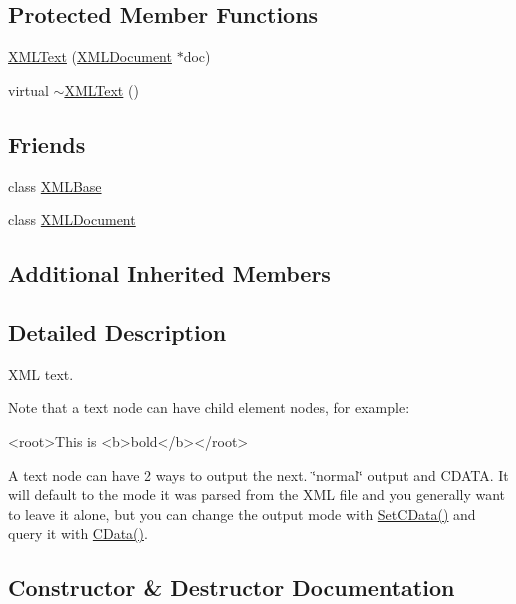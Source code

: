 \subsection*{Protected Member Functions}
\begin{DoxyCompactItemize}
\item 
\hyperlink{classtinyxml2_1_1_x_m_l_text_ad9f46d70e61e5386ead93728d8b90267}{X\+M\+L\+Text} (\hyperlink{classtinyxml2_1_1_x_m_l_document}{X\+M\+L\+Document} $\ast$doc)
\item 
virtual \hyperlink{classtinyxml2_1_1_x_m_l_text_ae9b8790d0dc13914394dbd7437c0e59d}{$\sim$\+X\+M\+L\+Text} ()
\end{DoxyCompactItemize}
\subsection*{Friends}
\begin{DoxyCompactItemize}
\item 
class \hyperlink{classtinyxml2_1_1_x_m_l_text_a449202cfc89e7ae5c2f81995476f9ec1}{X\+M\+L\+Base}
\item 
class \hyperlink{classtinyxml2_1_1_x_m_l_text_a4eee3bda60c60a30e4e8cd4ea91c4c6e}{X\+M\+L\+Document}
\end{DoxyCompactItemize}
\subsection*{Additional Inherited Members}


\subsection{Detailed Description}
X\+M\+L text.

Note that a text node can have child element nodes, for example\+: \begin{DoxyVerb}<root>This is <b>bold</b></root>
\end{DoxyVerb}


A text node can have 2 ways to output the next. \char`\"{}normal\char`\"{} output and C\+D\+A\+T\+A. It will default to the mode it was parsed from the X\+M\+L file and you generally want to leave it alone, but you can change the output mode with \hyperlink{classtinyxml2_1_1_x_m_l_text_ad080357d76ab7cc59d7651249949329d}{Set\+C\+Data()} and query it with \hyperlink{classtinyxml2_1_1_x_m_l_text_a125574fe49da80efbae1349f20d02d41}{C\+Data()}. 

\subsection{Constructor \& Destructor Documentation}
\hypertarget{classtinyxml2_1_1_x_m_l_text_ad9f46d70e61e5386ead93728d8b90267}{}

